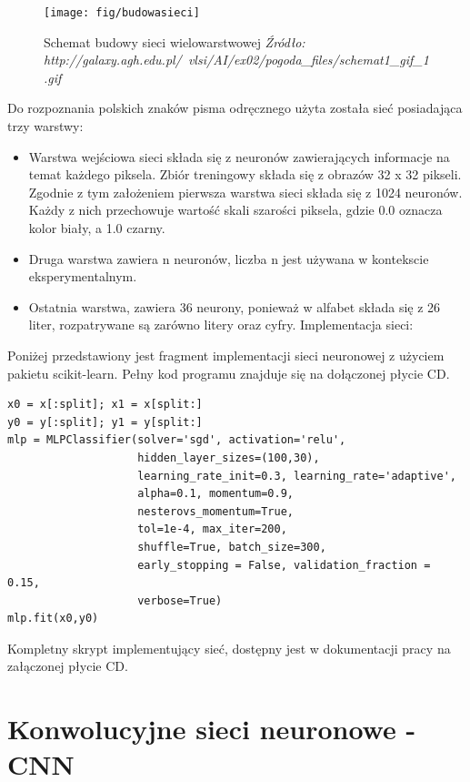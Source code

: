 \documentclass[brudnopis]{xmgr}
\begin{document}
\begin{figure}[!tbh]
\centering
\texttt{[image: fig/budowasieci]}
\caption{Schemat budowy sieci wielowarstwowej \emph{Źródło: http://galaxy.agh.edu.pl/~vlsi/AI/ex02/pogoda\_files/schemat1\_gif\_1.gif}}
\end{figure}
\newpage

Do rozpoznania polskich znaków pisma odręcznego użyta została sieć posiadająca trzy warstwy:

\begin{itemize}
\item
Warstwa wejściowa sieci składa się z neuronów zawierających informacje na temat każdego piksela. Zbiór treningowy składa się z obrazów 32 x 32 pikseli. Zgodnie z tym założeniem pierwsza warstwa sieci składa się z 1024 neuronów. Każdy z nich przechowuje wartość skali szarości piksela, gdzie 0.0 oznacza kolor biały, a 1.0 czarny.
\item
Druga warstwa zawiera n neuronów, liczba n jest używana w kontekscie eksperymentalnym.
\item
Ostatnia warstwa, zawiera 36 neurony, ponieważ w alfabet składa się z 26 liter, rozpatrywane są zarówno litery oraz cyfry. Implementacja sieci:
\end{itemize}

Poniżej przedstawiony jest fragment implementacji sieci neuronowej z użyciem pakietu scikit-learn\cite{17}. Pełny kod programu znajduje się na dołączonej płycie CD.

\begin{verbatim}
x0 = x[:split]; x1 = x[split:]
y0 = y[:split]; y1 = y[split:]
mlp = MLPClassifier(solver='sgd', activation='relu',
                    hidden_layer_sizes=(100,30),
                    learning_rate_init=0.3, learning_rate='adaptive', 
                    alpha=0.1, momentum=0.9, 
                    nesterovs_momentum=True,
                    tol=1e-4, max_iter=200,
                    shuffle=True, batch_size=300,
                    early_stopping = False, validation_fraction = 0.15,
                    verbose=True)
mlp.fit(x0,y0)
\end{verbatim}

Kompletny skrypt implementujący sieć, dostępny jest w dokumentacji pracy na załączonej płycie CD.
\newpage

\section{Konwolucyjne sieci neuronowe - CNN}
\end{document}
